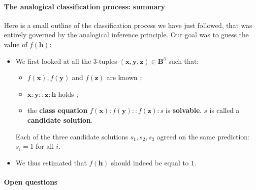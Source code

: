 \paragraph{The analogical classification process: summary\\}

Here is a small outline of the classification process we have just followed,
that was entirely governed by the analogical inference principle. Our goal was
to guess the value of $f(\mathbf{h})$:

\begin{itemize}
  \item We first looked at all the $3$-tuples $(\mathbf{x}, \mathbf{y}, \mathbf{z}) \in
    \mathbf{B}^3$ such that:
    \begin{itemize}
      \item $f(\mathbf{x}), f(\mathbf{y})$ and $f(\mathbf{z})$ are known ;
      \item $\mathbf{x}:\mathbf{y}::\mathbf{z}:\mathbf{h}$ holds ;
      \item the \textbf{class equation} $f(\mathbf{x}) :f(\mathbf{y}) ::
        f(\mathbf{z}) :s$ is \textbf{solvable}. $s$ is called a
        \textbf{candidate solution}.
    \end{itemize}
    Each of the three candidate solutions $s_1, s_2, s_3$ agreed on the same prediction:
    $s_i = 1$ for all $i$.
  \item We thus estimated that $f(\mathbf{h})$ should indeed be equal to $1$.
\end{itemize}

\paragraph{Open questions\\}

